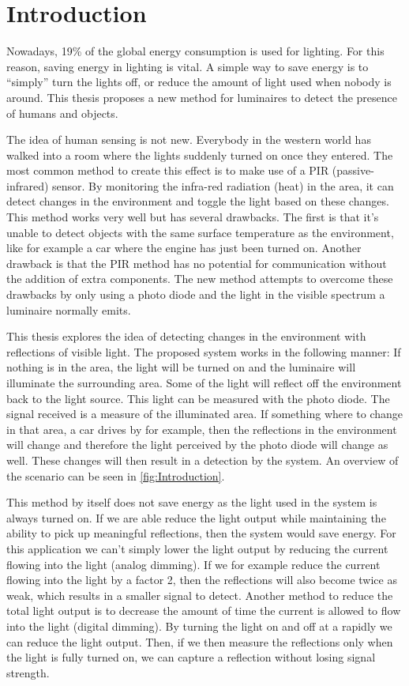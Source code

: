 \chapter{Introduction}
\label{chp:introduction}
Nowadays, 19\% of the global energy consumption is used for lighting. For this reason, saving energy in lighting is vital. A simple way to save energy is to “simply” turn the lights off, or reduce the amount of light used when nobody is around. This thesis proposes a new method for luminaires to detect the presence of humans and objects.

The idea of human sensing is not new. Everybody in the western world has walked into a room where the lights suddenly turned on once they entered. The most common method to create this effect is to make use of a PIR (passive-infrared) sensor. By monitoring the infra-red radiation (heat) in the area, it can detect changes in the environment and toggle the light based on these changes. This method works very well but has several drawbacks. The first is that it's unable to detect objects with the same surface temperature as the environment, like for example a car where the engine has just been turned on. Another drawback is that the PIR method has no potential for communication without the addition of extra components. The new method attempts to overcome these drawbacks by only using a photo diode and the light in the visible spectrum a luminaire normally emits.

This thesis explores the idea of detecting changes in the environment with reflections of visible light. The proposed system works in the following manner: If nothing is in the area, the light will be turned on and the luminaire will illuminate the surrounding area. Some of the light will reflect off the environment back to the light source. This light can be measured with the photo diode. The signal received is a measure of the illuminated area. If something where to change in that area, a car drives by for example, then the reflections in the environment will change and therefore the light perceived by the photo diode will change as well. These changes will then result in a detection by the system. An overview of the scenario can be seen in \ref{fig:Introduction}.

This method by itself does not save energy as the light used in the system is always turned on. If we are able reduce the light output while maintaining the ability to pick up meaningful reflections, then the system would save energy. For this application we can’t simply lower the light output by reducing the current flowing into the light (analog dimming). If we for example reduce the current flowing into the light by a factor 2, then the reflections will also become twice as weak, which results in a smaller signal to detect. Another method to reduce the total light output is to decrease the amount of time the current is allowed to flow into the light (digital dimming). By turning the light on and off at a rapidly we can reduce the light output. Then, if we then measure the reflections only when the light is fully turned on, we can capture a reflection without losing signal strength.


